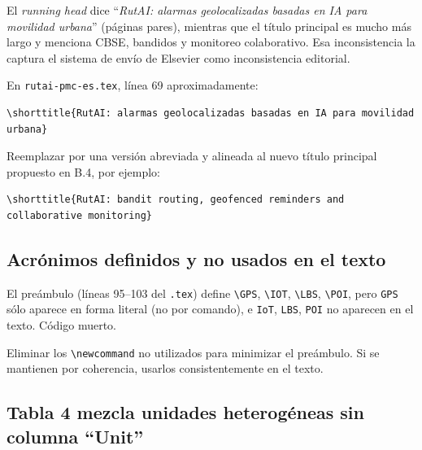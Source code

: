 \documentclass[11pt,a4paper]{article}
\begin{document}
\begin{deficiencia}[m.1 --- Deficiencia]
El \emph{running head} dice ``\emph{RutAI: alarmas geolocalizadas basadas en IA para movilidad urbana}'' (p\'aginas pares), mientras que el t\'itulo principal es mucho m\'as largo y menciona CBSE, bandidos y monitoreo colaborativo. Esa inconsistencia la captura el sistema de env\'io de Elsevier como inconsistencia editorial.
\end{deficiencia}

\begin{abordaje}
En \texttt{rutai-pmc-es.tex}, l\'inea 69 aproximadamente:
\begin{verbatim}
\shorttitle{RutAI: alarmas geolocalizadas basadas en IA para movilidad urbana}
\end{verbatim}
Reemplazar por una versi\'on abreviada y alineada al nuevo t\'itulo principal propuesto en B.4, por ejemplo:
\begin{verbatim}
\shorttitle{RutAI: bandit routing, geofenced reminders and collaborative monitoring}
\end{verbatim}
\end{abordaje}

\subsection{Acr\'onimos definidos y no usados en el texto}

\begin{deficiencia}[m.2 --- Deficiencia]
El pre\'ambulo (l\'ineas 95--103 del \texttt{.tex}) define \texttt{\textbackslash GPS}, \texttt{\textbackslash IOT}, \texttt{\textbackslash LBS}, \texttt{\textbackslash POI}, pero \texttt{GPS} s\'olo aparece en forma literal (no por comando), e \texttt{IoT}, \texttt{LBS}, \texttt{POI} no aparecen en el texto. C\'odigo muerto.
\end{deficiencia}

\begin{abordaje}
Eliminar los \texttt{\textbackslash newcommand} no utilizados para minimizar el pre\'ambulo. Si se mantienen por coherencia, usarlos consistentemente en el texto.
\end{abordaje}

\subsection{Tabla 4 mezcla unidades heterog\'eneas sin columna ``Unit''}
\end{document}
